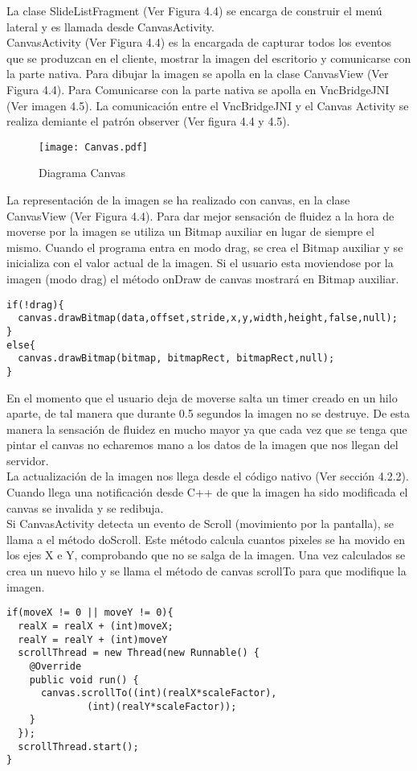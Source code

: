 La clase SlideListFragment (Ver Figura 4.4) se encarga de construir el menú lateral y es llamada desde CanvasActivity.\\

CanvasActivity (Ver Figura 4.4) es la encargada de capturar todos los eventos que se produzcan en el cliente, mostrar la imagen del escritorio y comunicarse con la parte nativa. Para dibujar la imagen se apolla en la clase CanvasView (Ver Figura 4.4). Para Comunicarse con la parte nativa se apolla en VncBridgeJNI (Ver imagen 4.5). La comunicación entre el VncBridgeJNI y el Canvas Activity se realiza demiante el patrón observer (Ver figura 4.4 y 4.5).\\

\begin{figure}[h]
\begin{center}
\texttt{[image: Canvas.pdf]}
\end{center}
\caption{Diagrama Canvas}
\end{figure}

La representación de la imagen se ha realizado con canvas, en la clase CanvasView (Ver Figura 4.4). Para dar mejor sensación de fluidez a la hora de moverse por la imagen se utiliza un Bitmap auxiliar en lugar de siempre el mismo. Cuando el programa entra en modo drag, se crea el Bitmap auxiliar y se inicializa con el valor actual de la imagen. Si el usuario esta moviendose por la imagen (modo drag) el método onDraw de canvas mostrará en Bitmap auxiliar.
\begin{lstlisting}
if(!drag){	
  canvas.drawBitmap(data,offset,stride,x,y,width,height,false,null);
}
else{
  canvas.drawBitmap(bitmap, bitmapRect, bitmapRect,null);
}
\end{lstlisting}
\newpage
En el momento que el usuario deja de moverse salta un timer creado en un hilo aparte, de tal manera que durante 0.5 segundos la imagen no se destruye. De esta manera la sensación de fluidez en mucho mayor ya que cada vez que se tenga que pintar el canvas no echaremos mano a los datos de la imagen que nos llegan del servidor.\\

La actualización de la imagen nos llega desde el código nativo (Ver sección 4.2.2). Cuando llega una notificación desde C++ de que la imagen ha sido modificada el canvas se invalida y se redibuja.\\

Si CanvasActivity detecta un evento de Scroll (movimiento por la pantalla), se llama a el método doScroll. Este método calcula cuantos pixeles se ha movido en los ejes X e Y, comprobando que no se salga de la imagen. Una vez calculados se crea un nuevo hilo y se llama el método de canvas scrollTo para que modifique la imagen.
\begin{lstlisting}
if(moveX != 0 || moveY != 0){
  realX = realX + (int)moveX;
  realY = realY + (int)moveY
  scrollThread = new Thread(new Runnable() {
    @Override
    public void run() {
      canvas.scrollTo((int)(realX*scaleFactor),
		      (int)(realY*scaleFactor));
    }
  });
  scrollThread.start();
}
\end{lstlisting}

